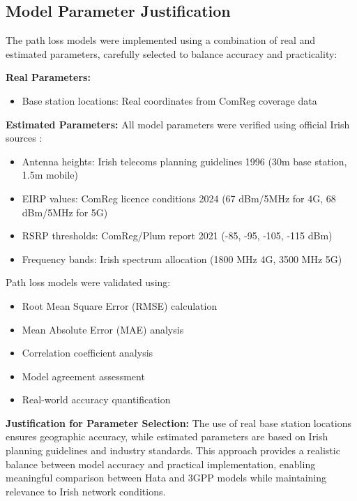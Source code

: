 \documentclass[MScCS]{uccthesis}
\begin{document}
   \subsection{Model Parameter Justification}
    The path loss models were implemented using a combination of real and estimated parameters, carefully selected to balance accuracy and practicality:

   \textbf{Real Parameters:}
   \begin{itemize}
   \item Base station locations: Real coordinates from ComReg coverage data
   \end{itemize}
  

   \textbf{Estimated Parameters:}
    All model parameters were verified using official Irish sources \cite{comreg25_13,comreg_plum_21118,comreg2140_IM,doe1996}:
   \begin{itemize}
   \item Antenna heights: Irish telecoms planning guidelines 1996 (30m base station, 1.5m mobile)
   \item EIRP values: ComReg licence conditions 2024 (67 dBm/5MHz for 4G, 68 dBm/5MHz for 5G)
   \item RSRP thresholds: ComReg/Plum report 2021 (-85, -95, -105, -115 dBm) \cite{rudd2021coverage}
   \item Frequency bands: Irish spectrum allocation (1800 MHz 4G, 3500 MHz 5G)
   \end{itemize}

   
   Path loss models were validated using:
   \begin{itemize}
   \item Root Mean Square Error (RMSE) calculation
   \item Mean Absolute Error (MAE) analysis
   \item Correlation coefficient analysis
   \item Model agreement assessment
   \item Real-world accuracy quantification
   \end{itemize}

   \textbf{Justification for Parameter Selection:} The use of real base station locations ensures geographic accuracy, while estimated parameters are based on Irish planning guidelines and industry standards. This approach provides a realistic balance between model accuracy and practical implementation, enabling meaningful comparison between Hata and 3GPP models while maintaining relevance to Irish network conditions.
\end{document}
